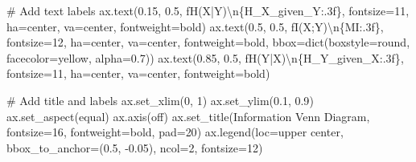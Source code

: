 \documentclass[
  11pt,
  letterpaper,
  oneside,
  openany]{book}
\newenvironment{Shaded}{\begin{snugshade}}{\end{snugshade}}
\newcommand{\BuiltInTok}[1]{\textcolor[rgb]{0.00,0.23,0.31}{#1}}
\newcommand{\CharTok}[1]{\textcolor[rgb]{0.13,0.47,0.30}{#1}}
\newcommand{\CommentTok}[1]{\textcolor[rgb]{0.37,0.37,0.37}{#1}}
\newcommand{\DecValTok}[1]{\textcolor[rgb]{0.68,0.00,0.00}{#1}}
\newcommand{\FloatTok}[1]{\textcolor[rgb]{0.68,0.00,0.00}{#1}}
\newcommand{\NormalTok}[1]{\textcolor[rgb]{0.00,0.23,0.31}{#1}}
\newcommand{\OperatorTok}[1]{\textcolor[rgb]{0.37,0.37,0.37}{#1}}
\newcommand{\SpecialCharTok}[1]{\textcolor[rgb]{0.37,0.37,0.37}{#1}}
\newcommand{\SpecialStringTok}[1]{\textcolor[rgb]{0.13,0.47,0.30}{#1}}
\newcommand{\StringTok}[1]{\textcolor[rgb]{0.13,0.47,0.30}{#1}}
\begin{document}
\begin{Shaded}
\begin{Highlighting}[]
    \CommentTok{\# Add text labels}
\NormalTok{    ax.text(}\FloatTok{0.15}\NormalTok{, }\FloatTok{0.5}\NormalTok{, }\SpecialStringTok{f\textquotesingle{}H(X|Y)}\CharTok{\textbackslash{}n}\SpecialCharTok{\{}\NormalTok{H\_X\_given\_Y}\SpecialCharTok{:.3f\}}\SpecialStringTok{\textquotesingle{}}\NormalTok{, }
\NormalTok{            fontsize}\OperatorTok{=}\DecValTok{11}\NormalTok{, ha}\OperatorTok{=}\StringTok{\textquotesingle{}center\textquotesingle{}}\NormalTok{, va}\OperatorTok{=}\StringTok{\textquotesingle{}center\textquotesingle{}}\NormalTok{, fontweight}\OperatorTok{=}\StringTok{\textquotesingle{}bold\textquotesingle{}}\NormalTok{)}
\NormalTok{    ax.text(}\FloatTok{0.5}\NormalTok{, }\FloatTok{0.5}\NormalTok{, }\SpecialStringTok{f\textquotesingle{}I(X;Y)}\CharTok{\textbackslash{}n}\SpecialCharTok{\{}\NormalTok{MI}\SpecialCharTok{:.3f\}}\SpecialStringTok{\textquotesingle{}}\NormalTok{, }
\NormalTok{            fontsize}\OperatorTok{=}\DecValTok{12}\NormalTok{, ha}\OperatorTok{=}\StringTok{\textquotesingle{}center\textquotesingle{}}\NormalTok{, va}\OperatorTok{=}\StringTok{\textquotesingle{}center\textquotesingle{}}\NormalTok{, fontweight}\OperatorTok{=}\StringTok{\textquotesingle{}bold\textquotesingle{}}\NormalTok{,}
\NormalTok{            bbox}\OperatorTok{=}\BuiltInTok{dict}\NormalTok{(boxstyle}\OperatorTok{=}\StringTok{\textquotesingle{}round\textquotesingle{}}\NormalTok{, facecolor}\OperatorTok{=}\StringTok{\textquotesingle{}yellow\textquotesingle{}}\NormalTok{, alpha}\OperatorTok{=}\FloatTok{0.7}\NormalTok{))}
\NormalTok{    ax.text(}\FloatTok{0.85}\NormalTok{, }\FloatTok{0.5}\NormalTok{, }\SpecialStringTok{f\textquotesingle{}H(Y|X)}\CharTok{\textbackslash{}n}\SpecialCharTok{\{}\NormalTok{H\_Y\_given\_X}\SpecialCharTok{:.3f\}}\SpecialStringTok{\textquotesingle{}}\NormalTok{, }
\NormalTok{            fontsize}\OperatorTok{=}\DecValTok{11}\NormalTok{, ha}\OperatorTok{=}\StringTok{\textquotesingle{}center\textquotesingle{}}\NormalTok{, va}\OperatorTok{=}\StringTok{\textquotesingle{}center\textquotesingle{}}\NormalTok{, fontweight}\OperatorTok{=}\StringTok{\textquotesingle{}bold\textquotesingle{}}\NormalTok{)}
    
    \CommentTok{\# Add title and labels}
\NormalTok{    ax.set\_xlim(}\DecValTok{0}\NormalTok{, }\DecValTok{1}\NormalTok{)}
\NormalTok{    ax.set\_ylim(}\FloatTok{0.1}\NormalTok{, }\FloatTok{0.9}\NormalTok{)}
\NormalTok{    ax.set\_aspect(}\StringTok{\textquotesingle{}equal\textquotesingle{}}\NormalTok{)}
\NormalTok{    ax.axis(}\StringTok{\textquotesingle{}off\textquotesingle{}}\NormalTok{)}
\NormalTok{    ax.set\_title(}\StringTok{\textquotesingle{}Information Venn Diagram\textquotesingle{}}\NormalTok{, fontsize}\OperatorTok{=}\DecValTok{16}\NormalTok{, fontweight}\OperatorTok{=}\StringTok{\textquotesingle{}bold\textquotesingle{}}\NormalTok{, pad}\OperatorTok{=}\DecValTok{20}\NormalTok{)}
\NormalTok{    ax.legend(loc}\OperatorTok{=}\StringTok{\textquotesingle{}upper center\textquotesingle{}}\NormalTok{, bbox\_to\_anchor}\OperatorTok{=}\NormalTok{(}\FloatTok{0.5}\NormalTok{, }\OperatorTok{{-}}\FloatTok{0.05}\NormalTok{), ncol}\OperatorTok{=}\DecValTok{2}\NormalTok{, fontsize}\OperatorTok{=}\DecValTok{12}\NormalTok{)}
    

\end{Highlighting}
\end{Shaded}
\end{document}
